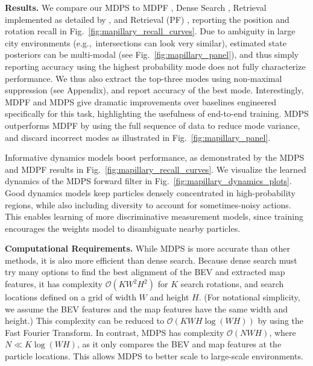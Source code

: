             \textbf{Results.} We compare our MDPS to MDPF \cite{younis2023mdpf}, Dense Search \cite{sarlin2023orienternet}, Retrieval \cite{noe2020eccv} implemented as detailed by \cite{sarlin2023orienternet}, and Retrieval (PF) \cite{9635972GausePF}, reporting the position and rotation recall in Fig.~\ref{fig:mapillary_recall_curves}. Due to ambiguity in large city environments (e.g.,~intersections can look very similar), estimated state posteriors can be multi-modal (see Fig.~\ref{fig:mapillary_panel}), and thus simply reporting accuracy using the highest probability mode does not fully characterize performance. We thus also extract the top-three modes using non-maximal suppression (see Appendix), and report accuracy of the best mode. Interestingly, MDPF and MDPS give dramatic improvements over baselines engineered specifically for this task, highlighting the usefulness of end-to-end training. MDPS outperforms MDPF by using the full sequence of data to reduce mode variance, and discard incorrect modes as illustrated in Fig.~\ref{fig:mapillary_panel}.

            Informative dynamics models boost performance, as demonstrated by the MDPS and MDPF results in Fig.~\ref{fig:mapillary_recall_curves}. We visualize the learned dynamics of the MDPS forward filter in Fig.~\ref{fig:mapillary_dynamics_plots}. 
            Good dynamics models 
            keep particles densely concentrated in high-probability regions, while also including diversity to account for sometimes-noisy actions. This enables learning of more discriminative measurement models, since training encourages the weights model to disambiguate nearby particles.


            \textbf{Computational Requirements.} While MDPS is more accurate than other methods, it is also more efficient than dense search.  Because dense search must try many options to find the best alignment of the BEV and extracted map features, it has complexity $\mathcal{O}(KW^2H^2)$ for $K$ search rotations, and search locations defined on a grid of width $W$ and height $H$. %
            (For notational simplicity, we assume the BEV features and the map features have the same width and height.) This complexity can be reduced to $\mathcal{O}(KWH \log (WH))$ by using the Fast Fourier Transform. In contrast, MDPS has complexity $\mathcal{O}(NWH)$, where $N \ll K\log(WH)$, as it only compares the BEV and map features at the particle locations.  This allows MDPS to better scale to large-scale environments. %
                        
